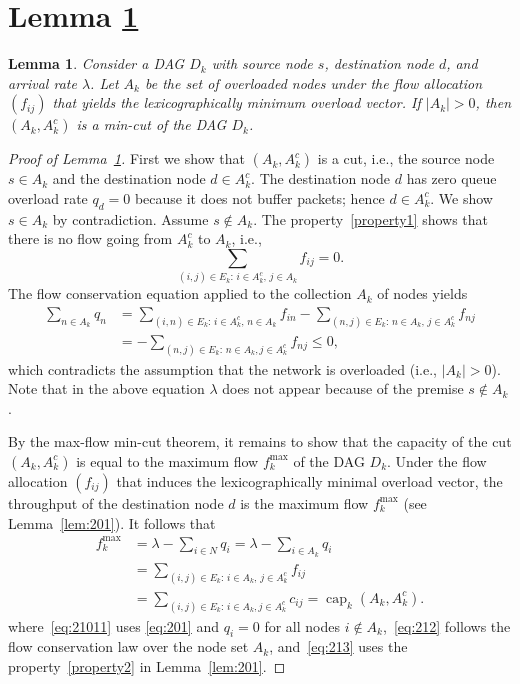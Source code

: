 \documentclass{sig-alternate-2013}
\newtheorem{lemma}{Lemma}
\newcommand{\capp}{\operatorname{cap}}
\begin{document}
\section{Lemma \ref{MIN-CUT}}\label{app:A}
\begin{lemma}\label{MIN-CUT}
Consider a DAG $D_k$ with source node $s$, destination node $d$, and arrival rate $\lambda$. Let $A_{k}$ be the set of overloaded nodes under the flow allocation $(f_{ij})$ that yields the lexicographically minimum overload vector. If $|A_{k}| > 0$, then $(A_{k}, A_{k}^c)$ is a min-cut of the DAG $D_{k}$.
\end{lemma}
\begin{proof}[Proof of Lemma~\ref{MIN-CUT}]
First we show that $(A_{k}, A_{k}^c)$ is a cut, i.e., the source node $s\in A_{k}$  and the destination node $d\in A_{k}^{c}$. The destination node $d$ has zero queue overload rate $q_{d}=0$ because it does not buffer packets; hence $d\in A_{k}^{c}$. We show $s \in A_{k}$ by contradiction. Assume $s \notin A_{k}$.  The property~\eqref{property1} shows that there is no flow going from $A_{k}^{c}$ to $A_{k}$, i.e., 
\[
\sum_{(i, j) \in E_{k}:\, i\in A_{k}^{c},\, j\in A_{k}} f_{ij} = 0.
\]
The flow conservation equation applied to the collection $A_{k}$ of nodes yields
\begin{align*}
\sum_{n \in A_{k}} q_n &= \sum_{(i,n)\in E_{k}:\, i\in A_{k}^c,\, n\in A_{k}} f_{in} - \sum_{(n,j)\in E_{k}:\, n \in A_{k},\, j \in A_{k}^c} f_{nj}\\
&=  - \sum_{(n, j)\in E_{k}:\, n \in A_{k}, j \in A_{k}^c} f_{nj} \leq 0,
\end{align*}
which contradicts the assumption that the network is overloaded (i.e., $|A_{k}|>0$). Note that in the above equation $\lambda$ does not appear because of the premise $s\notin A_k$.

By the max-flow min-cut theorem, it remains to show that the capacity of the cut $(A_{k}, A_{k}^{c})$ is equal to the maximum flow $f_{k}^{\text{max}}$ of the DAG $D_{k}$. Under the flow allocation $(f_{ij})$ that induces the lexicographically minimal overload vector, the throughput of the destination node $d$ is the maximum flow $f_{k}^{\text{max}}$ (see Lemma~\ref{lem:201}). It follows that
\begin{align} 
f_{k}^{\text{max}} &= \lambda - \sum_{i\in N} q_{i} = \lambda- \sum_{i\in A_{k}} q_i \label{eq:21011} \\
&= \sum_{(i,j)\in E_{k}:\, i\in A_{k},\, j\in A_{k}^c} f_{ij} \label{eq:212} \\
&= \sum_{(i,j)\in E_{k}:\, i\in A_{k}, j\in A_{k}^c} c_{ij} = \capp_k(A_{k}, A_{k}^{c}). \label{eq:213} 
\end{align}
where~\eqref{eq:21011} uses \eqref{eq:201} and $q_{i}=0$ for all nodes $i\notin A_{k}$,~\eqref{eq:212} follows the flow conservation law over the node set $A_{k}$, and~\eqref{eq:213} uses the property~\eqref{property2} in Lemma~\ref{lem:201}.
\end{proof}
\end{document}
